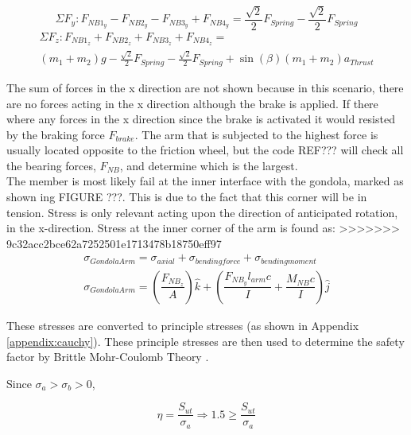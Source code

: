 \documentclass[../main.tex]{subfiles}
\begin{document}
\begin{equation} \label{FygondLA}
\Sigma F_{y} : F_{NB1_{y}} - F_{NB2_{y}} - F_{NB3_{y}} + F_{NB4_{y}} = \frac{\sqrt{2}}{2} F_{Spring} -\frac{\sqrt{2}}{2} F_{Spring} 
\end{equation}
\begin{multline} \label{FzgondLA}
\Sigma F_{z} : F_{NB1_{z}} + F_{NB2_{z}} + F_{NB3_{z}} + F_{NB4_{z}} =\\ (m_{1} + m_2)g - \frac{\sqrt{2}}{2} F_{Spring} - \frac{\sqrt{2}}{2} F_{Spring} + \sin(\beta) (m_1+m_2) a_{Thrust}
\end{multline}
 

The sum of forces in the x direction are not shown because in this scenario, there are no forces acting in the x direction although the brake is applied. If there where any forces in the x direction since the brake is activated it would resisted by the braking force $F_{brake}$. The arm that is subjected to the highest force is usually located opposite to the friction wheel, but the code REF??? will check all the bearing forces, $F_{NB}$, and determine which is the largest. \\

The member is most likely fail at the inner interface with the gondola, marked as shown ing FIGURE ???. This is due to the fact that this corner will be in tension. Stress is only relevant acting upon the direction of anticipated rotation, in the x-direction. Stress at the inner corner of the arm is found as:
>>>>>>> 9c32acc2bce62a7252501e1713478b18750eff97
\begin{align}
	\sigma _{Gondola Arm} = \sigma _{axial} + \sigma _{bending force} + \sigma _{bending moment} \\ \label{armStress}
	\sigma _{Gondola Arm}  = \left(\dfrac{F_{NB_{z}}}{A}\right)\hat{k} + \left(\dfrac{F_{NB_{y}}l_{arm}c}{I}  + \dfrac{M_{NB}c}{I} \right) \hat{j}
\end{align}

These stresses are converted to principle stresses (as shown in Appendix \ref{appendix:cauchy}). These principle stresses are then used to determine the safety factor by Brittle Mohr-Coulomb Theory \cite[227]{shigley}.

Since $\sigma _a > \sigma _b > 0$,

\begin{equation}
	\eta = \dfrac{S_{ut}}{\sigma _a} \Rightarrow 1.5 \geq \dfrac{S_{ut}}{\sigma _a}
\end{equation}
\end{document}
